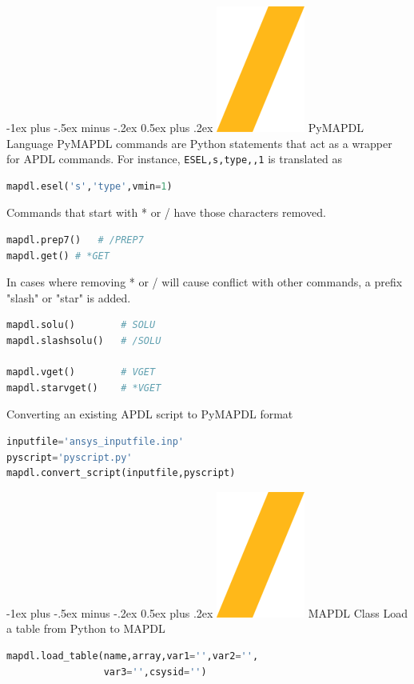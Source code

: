 \documentclass[9pt,landscape]{article}
\makeatletter
\renewcommand{\section}{\@startsection{section}{1}{0mm}%
                                {-1ex plus -.5ex minus -.2ex}%
                                {0.5ex plus .2ex}%
                                {\normalfont\large\bfseries}}
\def\code#1{\texttt{#1}}
\makeatother
\begin{document}
\begin{multicols}{3}
\section{\includegraphics[height=\fontcharht\font`\S]{slash.png} PyMAPDL Language}
PyMAPDL commands are Python statements that act as a wrapper for APDL commands. For instance, \code{ESEL,s,type,,1} is translated as
\begin{lstlisting}[language=Python]
mapdl.esel('s','type',vmin=1) 
\end{lstlisting}

Commands that start with * or / have those characters removed.
\begin{lstlisting}[language=Python]
mapdl.prep7()	# /PREP7
mapdl.get()	# *GET
\end{lstlisting}

In cases where removing * or / will cause conflict with other commands, a prefix "slash" or "star" is added.
\begin{lstlisting}[language=Python]
mapdl.solu()		# SOLU
mapdl.slashsolu()	# /SOLU

mapdl.vget()		# VGET
mapdl.starvget()	# *VGET
\end{lstlisting} 

\columnbreak
Converting an existing APDL script to PyMAPDL format
\begin{lstlisting}[language=Python]
inputfile='ansys_inputfile.inp'
pyscript='pyscript.py'
mapdl.convert_script(inputfile,pyscript)
\end{lstlisting} 

\section{\includegraphics[height=\fontcharht\font`\S]{slash.png} MAPDL Class}
Load a table from Python to MAPDL
\begin{lstlisting}[language=Python]
mapdl.load_table(name,array,var1='',var2='',
                 var3='',csysid='')
\end{lstlisting} 


\end{multicols}
\end{document}
